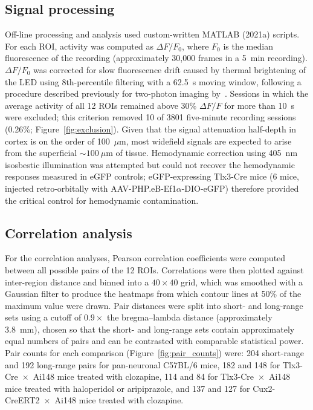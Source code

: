 \documentclass[11pt]{article}
\begin{document}
\subsection{Signal processing}
Off-line processing and analysis used custom-written MATLAB (2021a) scripts. For each ROI, activity was computed as $\Delta F / F_0$, where $F_0$ is the median fluorescence of the recording (approximately 30{,}000 frames in a 5~min recording). $\Delta F / F_0$ was corrected for slow fluorescence drift caused by thermal brightening of the LED using 8th-percentile filtering with a 62.5~s moving window, following a procedure described previously for two-photon imaging by~\citet{dombeck2007imaging}. Sessions in which the average activity of all 12 ROIs remained above 30\% $\Delta F / F$ for more than 10~s were excluded; this criterion removed 10 of 3801 five-minute recording sessions (0.26\%; Figure~\ref{fig:exclusion}). Given that the signal attenuation half-depth in cortex is on the order of 100~$\mu$m, most widefield signals are expected to arise from the superficial ${\sim}100~\mu$m of tissue. Hemodynamic correction using 405~nm isosbestic illumination was attempted but could not recover the hemodynamic responses measured in eGFP controls; eGFP-expressing Tlx3-Cre mice (6 mice, injected retro-orbitally with AAV-PHP.eB-Ef1$\alpha$-DIO-eGFP) therefore provided the critical control for hemodynamic contamination.

\subsection{Correlation analysis}
For the correlation analyses, Pearson correlation coefficients were computed between all possible pairs of the 12 ROIs. Correlations were then plotted against inter-region distance and binned into a $40\times40$ grid, which was smoothed with a Gaussian filter to produce the heatmaps from which contour lines at 50\% of the maximum value were drawn. Pair distances were split into short- and long-range sets using a cutoff of $0.9\times$ the bregma--lambda distance (approximately 3.8~mm), chosen so that the short- and long-range sets contain approximately equal numbers of pairs and can be contrasted with comparable statistical power. Pair counts for each comparison (Figure~\ref{fig:pair_counts}) were: 204 short-range and 192 long-range pairs for pan-neuronal C57BL/6 mice, 182 and 148 for Tlx3-Cre~$\times$~Ai148 mice treated with clozapine, 114 and 84 for Tlx3-Cre~$\times$~Ai148 mice treated with haloperidol or aripiprazole, and 137 and 127 for Cux2-CreERT2~$\times$~Ai148 mice treated with clozapine.
\end{document}
